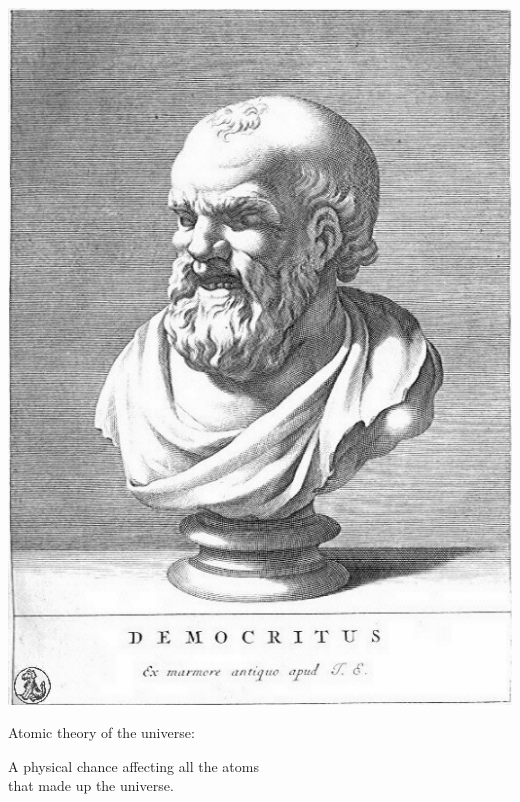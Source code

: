 \documentclass[9pt]{beamer}
\begin{document}
\begin{frame}[fragile]
\begin{center}
    \includegraphics[scale=0.30]{./figs/Democritus2.jpg}
    \bigskip


    Atomic theory of the universe:\\ \bigskip

    A physical chance affecting all the atoms\\
    that made up the universe.
  \end{center}
\end{frame}
\end{document}
